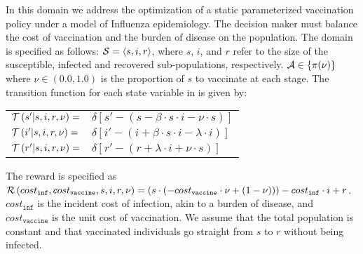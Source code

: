 In this domain we address the optimization of a static parameterized vaccination policy under a model of Influenza epidemiology. The decision maker must balance the cost of vaccination and the burden of disease on the population. The domain is specified as follows: {\footnotesize $ \mathcal{S} = \left\langle s, i, r \right\rangle$}, where $ s $, $ i $, and $ r $ refer to the size of the susceptible, infected and recovered sub-populations, respectively. {\footnotesize $ \mathcal{A} \in \left\lbrace \pi(\nu) \right\rbrace $} where {\footnotesize $\nu \in \left(0.0, 1.0\right)$} is the proportion of $ s $ to vaccinate at each stage. The transition function {\footnotesize \Transition} for each state variable in {\footnotesize \State} is given by:
    {\footnotesize 
        \abovedisplayskip=5pt
        \belowdisplayskip=0pt
        \renewcommand{\arraystretch}{1.5}
        \begin{tabular}{ll}
            $ \mathcal{T}\left( s' | s, i, r, \nu \right) =$ & $ \delta \left[ s' - (s - \beta \cdot s \cdot i - \nu \cdot s) \right] $ \\
            $ \mathcal{T}\left( i' | s, i, r, \nu \right) =$ & $ \delta \left[ i' - (i + \beta \cdot s \cdot i - \lambda \cdot i) \right] $ \\
            $ \mathcal{T}\left( r' | s, i, r, \nu \right) =$ & $ \delta \left[ r' - (r + \lambda \cdot i + \nu \cdot s) \right] $ \\            
        \end{tabular}
    }%
   
The reward is specified as {\footnotesize $ \mathcal{R}\left(cost_{\mathtt{inf}}, cost_{\mathtt{vaccine}}, s, i, r, \nu \right) = (s \cdot (-cost_{\mathtt{vaccine}} \cdot \nu + (1 - \nu))) - cost_{\mathtt{inf}} \cdot i + r$}. {\footnotesize $ cost_{\mathtt{inf}} $} is the incident cost of infection, akin to a burden of disease, and {\footnotesize $ cost_{\mathtt{vaccine}} $} is the unit cost of vaccination. We assume that the total population is constant and that vaccinated individuals go straight from {\footnotesize $ s $} to {\footnotesize $ r $} without being infected. 


